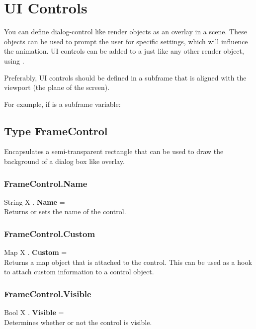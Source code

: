 \section{UI Controls \label{UI Controls}}
You can define dialog-control like render objects as an overlay in a scene. These objects can be used to prompt the user for specific settings, which will influence the animation. UI controls can be added to a  just like any other render object, using .

Preferably, UI controls should be defined in a subframe that is aligned with the viewport (the plane of the screen).

For example, if  is a subframe variable: \\

\subsection{Type FrameControl \label{T:FrameControl}}
Encapsulates a semi-transparent rectangle that can be used to draw the background of a dialog box like overlay.

\subsubsection{FrameControl.Name \label{F:FrameControl:Name}}
String X . \textbf{Name} = \\
Returns or sets the name of the control.

\subsubsection{FrameControl.Custom \label{F:FrameControl:Custom}}
Map X . \textbf{Custom} = \\
Returns a map object that is attached to the control. This can be used as a hook to attach custom information to a control object.

\subsubsection{FrameControl.Visible \label{F:FrameControl:Visible}}
Bool X . \textbf{Visible} = \\
Determines whether or not the control is visible.

